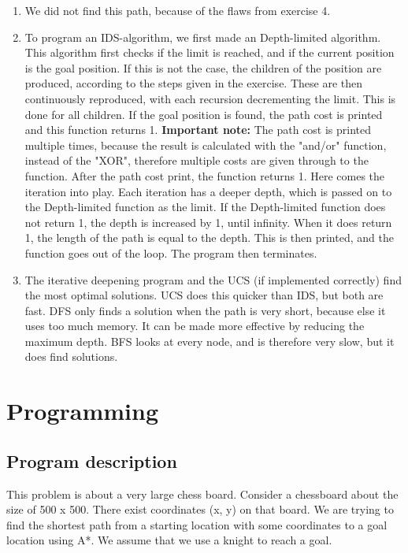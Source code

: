 \documentclass{article}
\begin{document}
\begin{enumerate}
		\item We did not find this path, because of the flaws from exercise 4.
		
		\item To program an IDS-algorithm, we first made an Depth-limited algorithm. This algorithm first checks if the limit is reached, and if the current position is the goal position. If this is not the case, the children of the position are produced, according to the steps given in the exercise. These are then continuously reproduced, with each recursion decrementing the limit. This is done for all children. If the goal position is found, the path cost is printed and this function returns 1. \textbf{Important note:} The path cost is printed multiple times, because the result is calculated with the "and/or" function, instead of the "XOR", therefore multiple costs are given through to the function. After the path cost print, the function returns 1. Here comes the iteration into play. Each iteration has a deeper depth, which is passed on to the Depth-limited function as the limit. If the Depth-limited function does not return 1, the depth is increased by 1, until infinity. When it does return 1, the length of the path is equal to the depth. This is then printed, and the function goes out of the loop. The program then terminates.
		
		\item The iterative deepening program and the UCS (if implemented correctly) find the most optimal solutions. UCS does this quicker than IDS, but both are fast. DFS only finds a solution when the path is very short, because else it uses too much memory. It can be made more effective by reducing the maximum depth. BFS looks at every node, and is therefore very slow, but it does find solutions.
	\end{enumerate}
	\section*{Programming} 
	\subsection*{Program description}
	This problem is about a very large chess board. Consider a chessboard about the size of 500 x 500. There exist coordinates (x, y) on that board. We are trying to find the shortest path from a starting location with some coordinates to a goal location using A*. We assume that we use a knight to reach a goal. 
	
\end{document}
